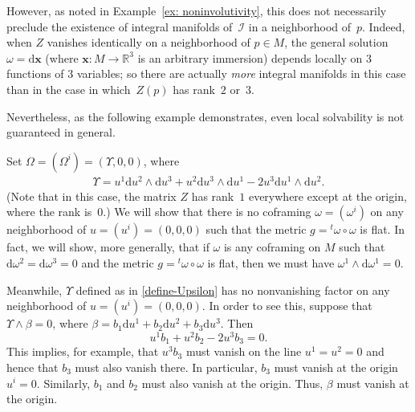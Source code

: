 \documentclass[pdftex]{sigma}
\numberwithin{equation}{section}
\renewcommand{\d}{\mathrm{d}}%
\newcommand{\cI}{{\mathcal I}}
\newcommand{\bbR}{{\mathbb R}}
\newcommand{\mbx}{\mathbf{x}}
\begin{document}
However, as noted in Example~\ref{ex: noninvolutivity},
this does not necessarily preclude
the existence of integral manifolds of~$\cI$ in a neighborhood of~$p$.
Indeed, when $Z$ vanishes identically on a neighborhood of $p \in M$,
the general solution $\omega = \d \mbx$ (where $\mbx\colon M \to \bbR^3$
is an arbitrary immersion)
depends locally on 3 functions of 3 variables;
so there are actually {\em more} integral manifolds
in this case than in the case in which~$Z(p)$ has rank~$2$ or~$3$.

Nevertheless, as the following example demonstrates, even local solvability is not guaranteed in general.

\begin{Example}\label{ex: nonsolvability}
Set $\Omega = (\Omega^i) = (\Upsilon,0,0)$, where
\begin{gather}\label{define-Upsilon}
\Upsilon = u^1 \d u^2\wedge\d u^3 + u^2 \d u^3\wedge\d u^1 - 2u^3 \d u^1\wedge\d u^2.
\end{gather}
(Note that in this case, the matrix $Z$ has rank~$1$
everywhere except at the origin, where the rank is~$0$.)
We will show that there is no coframing $\omega = (\omega^i)$ on any neighborhood of $u = (u^i) = (0,0,0)$ such that the metric $g = {}^t\omega\circ \omega$ is flat.
In fact, we will show, more generally, that if $\omega$ is any coframing on $M$ such that $\d\omega^2=\d\omega^3=0$
and the metric $g = {}^t\omega\circ \omega$ is flat,
then we must have $\omega^1 \wedge \d\omega^1 = 0$.

Meanwhile, $\Upsilon$ defined as in \eqref{define-Upsilon} has no nonvanishing factor on any neighborhood of $u = (u^i) = (0,0,0)$.
In order to see this, suppose that $\Upsilon\wedge \beta = 0$,
where $\beta = b_1 \d u^1 + b_2 \d u^2 + b_3 \d u^3$.
Then
\[ u^1b_1 + u^2b_2-2u^3b_3 = 0. \]
This implies, for example,
that $u^3b_3$ must vanish on the line $u^1=u^2=0$ and hence
that $b_3$ must also vanish there. In particular, $b_3$
must vanish at the origin $u^i=0$. Similarly, $b_1$ and $b_2$
must also vanish at the origin. Thus, $\beta$ must vanish
at the origin.


\end{Example}
\end{document}
